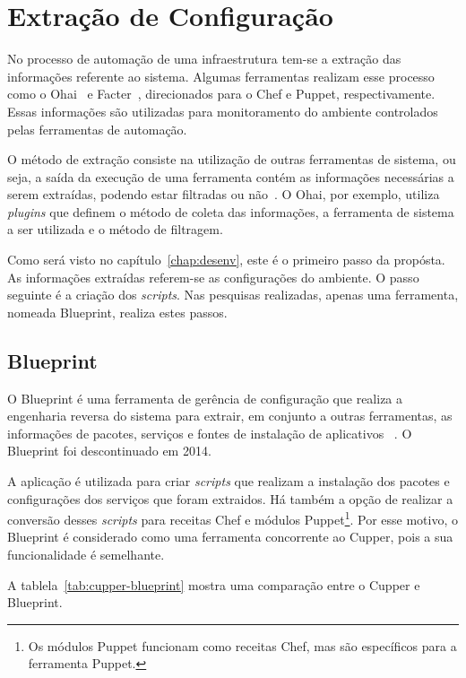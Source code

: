 \section{Extração de Configuração}

No processo de automação de uma infraestrutura tem-se a extração das
informações referente ao sistema. Algumas ferramentas realizam esse
processo como o Ohai~\cite{ohaidoc:2016} e Facter~\cite{facterdoc:2016},
direcionados para o Chef e Puppet, respectivamente. Essas informações
são utilizadas para monitoramento do ambiente controlados pelas ferramentas
de automação.

O método de extração consiste na utilização de outras ferramentas de sistema,
ou seja, a saída da execução de uma ferramenta contém as informações necessárias
a serem extraídas, podendo estar filtradas ou não~\cite{ohaidoc:2016}. O Ohai,
por exemplo, utiliza \textit{plugins} que definem o método de coleta das informações,
a ferramenta de sistema a ser utilizada e o método de filtragem.

Como será visto no capítulo~\ref{chap:desenv}, este é o primeiro passo da propósta.
As informações extraídas referem-se as configurações do ambiente. O passo
seguinte é a criação dos \textit{scripts}. Nas pesquisas realizadas, apenas uma ferramenta,
nomeada Blueprint, realiza estes passos.

\subsection{Blueprint}

O Blueprint é uma ferramenta de gerência de configuração que realiza a
engenharia reversa do sistema para extrair, em conjunto a outras ferramentas,
as informações de pacotes, serviços e fontes de instalação de aplicativos
~\cite{blueprint:2016}. O Blueprint foi descontinuado em 2014.

A aplicação é utilizada para criar \textit{scripts} que realizam
a instalação dos pacotes e configurações dos serviços que foram extraidos. Há
também a opção de realizar a conversão desses \textit{scripts} para receitas Chef e módulos
Puppet\footnote{Os módulos Puppet funcionam como receitas Chef, mas são específicos para a ferramenta Puppet.}.
Por esse motivo, o Blueprint é considerado como uma ferramenta concorrente ao Cupper,
pois a sua funcionalidade é semelhante.

A tablela~\ref{tab:cupper-blueprint} mostra uma comparação entre o Cupper e Blueprint.

